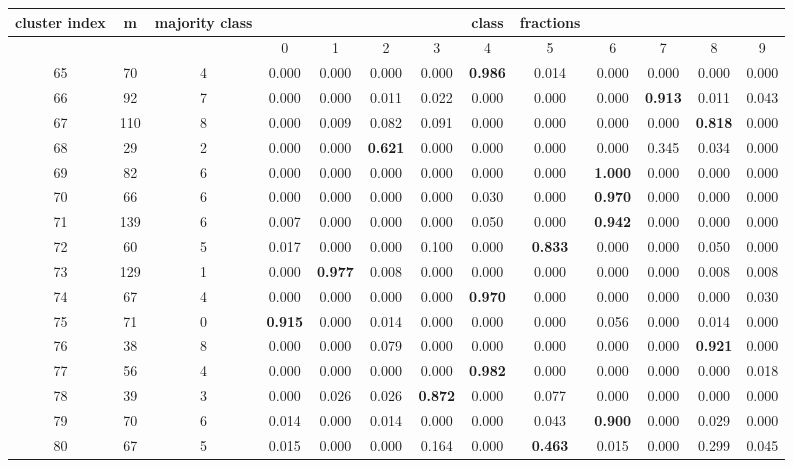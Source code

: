 \documentclass[a4paper,fleqn,usenatbib]{mnras}
\begin{document}
\begin{table*}
\renewcommand\thetable{1}
\centering
\begin{tabular}{|c|c|c|c|c|c|c|c|c|c|c|c|c|}
\hline
cluster index & m & majority class & & & & &class & fractions & & & & \\
\hline
   & & & 0 & 1 & 2 & 3 & 4 & 5 & 6 & 7 & 8 & 9 \\
\hline
\hline
65 & 70 & 4 & 0.000 & 0.000 & 0.000 & 0.000 & \textbf{0.986} & 0.014 & 0.000 & 0.000 & 0.000 & 0.000\\
66 & 92 & 7 & 0.000 & 0.000 & 0.011 & 0.022 & 0.000 & 0.000 & 0.000 & \textbf{0.913} & 0.011 & 0.043\\
67 & 110 & 8 & 0.000 & 0.009 & 0.082 & 0.091 & 0.000 & 0.000 & 0.000 & 0.000 & \textbf{0.818} & 0.000\\
68 & 29 & 2 & 0.000 & 0.000 & \textbf{0.621} & 0.000 & 0.000 & 0.000 & 0.000 & 0.345 & 0.034 & 0.000\\
69 & 82 & 6 & 0.000 & 0.000 & 0.000 & 0.000 & 0.000 & 0.000 & \textbf{1.000} & 0.000 & 0.000 & 0.000\\
70 & 66 & 6 & 0.000 & 0.000 & 0.000 & 0.000 & 0.030 & 0.000 & \textbf{0.970} & 0.000 & 0.000 & 0.000\\
71 & 139 & 6 & 0.007 & 0.000 & 0.000 & 0.000 & 0.050 & 0.000 & \textbf{0.942} & 0.000 & 0.000 & 0.000\\
72 & 60 & 5 & 0.017 & 0.000 & 0.000 & 0.100 & 0.000 & \textbf{0.833} & 0.000 & 0.000 & 0.050 & 0.000\\
73 & 129 & 1 & 0.000 & \textbf{0.977} & 0.008 & 0.000 & 0.000 & 0.000 & 0.000 & 0.000 & 0.008 & 0.008\\
74 & 67 & 4 & 0.000 & 0.000 & 0.000 & 0.000 & \textbf{0.970} & 0.000 & 0.000 & 0.000 & 0.000 & 0.030\\
75 & 71 & 0 & \textbf{0.915} & 0.000 & 0.014 & 0.000 & 0.000 & 0.000 & 0.056 & 0.000 & 0.014 & 0.000\\
76 & 38 & 8 & 0.000 & 0.000 & 0.079 & 0.000 & 0.000 & 0.000 & 0.000 & 0.000 & \textbf{0.921} & 0.000\\
77 & 56 & 4 & 0.000 & 0.000 & 0.000 & 0.000 & \textbf{0.982} & 0.000 & 0.000 & 0.000 & 0.000 & 0.018\\
78 & 39 & 3 & 0.000 & 0.026 & 0.026 & \textbf{0.872} & 0.000 & 0.077 & 0.000 & 0.000 & 0.000 & 0.000\\
79 & 70 & 6 & 0.014 & 0.000 & 0.014 & 0.000 & 0.000 & 0.043 & \textbf{0.900} & 0.000 & 0.029 & 0.000\\
80 & 67 & 5 & 0.015 & 0.000 & 0.000 & 0.164 & 0.000 & \textbf{0.463} & 0.015 & 0.000 & 0.299 & 0.045\\

\end{tabular}
\end{table*}
\end{document}
